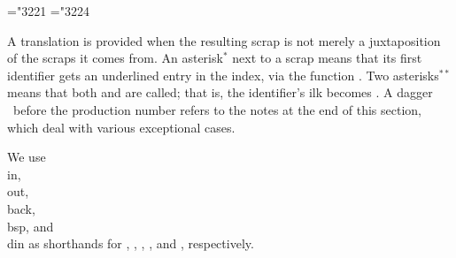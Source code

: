 \fi \newcount\prodno \newdimen\midcol \let\+\relax \ifon

\def\v{\char'174}
\mathchardef\RA="3221 %
\mathchardef\BA="3224 %

A translation is provided when the resulting scrap is not merely a
juxtaposition of the scraps it comes from.  An asterisk$^*$ next to a scrap
means that its first identifier gets an underlined entry in the index,
via the function .  Two asterisks$^{**}$ means that
both
 and  are called; that is, the
identifier's ilk becomes .  A dagger \dag\ before the
production number refers to the notes at the end of this section,
which deal with various exceptional cases.

We use \\{in}, \\{out}, \\{back}, \\{bsp}, and \\{din} as shorthands for
, , , , and %
, respectively.

